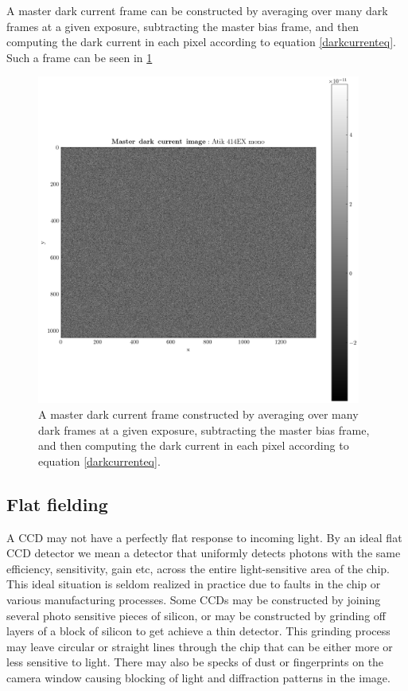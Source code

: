 \documentclass[../main.tex]{subfiles}
\begin{document}
	A master dark current frame can be constructed by averaging over many dark frames at a given exposure, subtracting the master bias frame, and then computing the dark current in each pixel according to equation \ref{darkcurrenteq}. Such a frame can be seen in \ref{fig:masterdarkcurrent}
	\begin{figure}[h!]
		\centering
		\includegraphics[width	=0.95\textwidth]{master_dark.png}
		\caption{A master dark current frame constructed by averaging over many dark frames at a given exposure, subtracting the master bias frame, and then computing the dark current in each pixel according to equation \ref{darkcurrenteq}.}
		\label{fig:masterdarkcurrent}
	\end{figure}
	
	\subsection{Flat fielding}\label{sec:flat}
	A CCD may not have a perfectly flat response to incoming light. By an ideal flat CCD detector we mean a detector that uniformly detects photons with the same efficiency, sensitivity, gain etc, across the entire light-sensitive area of the chip. This ideal situation is seldom realized in practice due to faults in the chip or various manufacturing processes. Some CCDs may be constructed by joining several photo sensitive pieces of silicon, or may be constructed by grinding off layers of a block of silicon to get achieve a thin detector. This grinding process may leave circular or straight lines through the chip that can be either more or less sensitive to light. There may also be specks of dust or fingerprints on the camera window causing blocking of light and diffraction patterns in the image.
	
\end{document}
